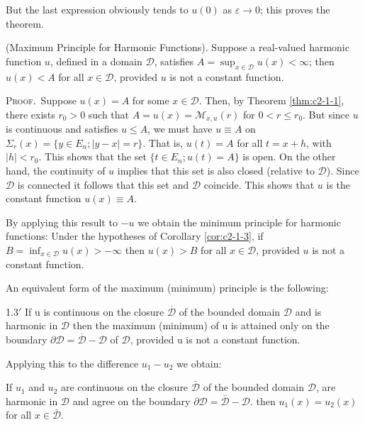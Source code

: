 But the last expression obviously tends to $u(0)$ as $\varepsilon \to 0$; this proves the theorem.

\begin{corollary}
\label{cor:c2-1-3}
(Maximum Principle for Harmonic Functions). Suppose a real-valued harmonic function $u$, defined in a domain $\mathcal{D}$, satisfies $A = \sup_{x \in \mathcal{D}} u(x) < \infty$; then $u(x) < A$ for all $x \in \mathcal{D}$, provided $u$ is not a constant function.
\end{corollary}

\textsc{Proof.}\ Suppose $u(x) = A$ for some $x \in \mathcal{D}$. Then, by Theorem \ref{thm:c2-1-1}, there exists $r_0 > 0$ such that $A = u(x) = \mathcal{M}_{x,u}(r)$ for $0 < r \leq r_0$. But since $u$ is continuous and satisfies $u \leq A$, we must have $u \equiv A$ on $\Sigma_r(x) = \{y \in E_n; |y - x| = r\}$. That is, $u(t) = A$ for all $t = x + h$, with $|h| < r_0$. This shows that the set $\{t \in E_n; u(t) = A\}$ is open. On the other hand, the continuity of $u$ implies that this set is also closed (relative to $\mathcal{D}$). Since $\mathcal{D}$ is connected it follows that this set and $\mathcal{D}$ coincide. This shows that $u$ is the constant function $u(x) \equiv A$.

By applying this result to $-u$ we obtain the minimum principle for harmonic functions: Under the hypotheses of Corollary \ref{cor:c2-1-3}, if $B = \inf_{x\in\mathcal{D}} u(x) > -\infty$ then $u(x) > B$ for all $x\in\mathcal{D}$, provided $u$ is not a constant function.

An equivalent form of the maximum (minimum) principle is the following:

\begin{customcor}{1.3$'$}
\label{cor:c2-1-3p}
If u is continuous on the closure $\overline{\mathcal{D}}$ of the bounded domain $\mathcal{D}$ and is harmonic in $\mathcal{D}$ then the maximum (minimum) of u is attained only on the boundary $\partial\mathcal{D} = \overline{\mathcal{D}} - \mathcal{D}$ of $\mathcal{D}$, provided u is not a constant function.
\end{customcor}

Applying this to the difference $u_{1}-u_{2}$ we obtain:

\begin{corollary}
\label{cor:c2-1-4}
If $u_1$ and $u_2$ are continuous on the closure $\bar{\mathcal{D}}$ of the bounded domain $\mathcal{D}$, are harmonic in $\mathcal{D}$ and agree on the boundary $\partial\mathcal{D} = \bar{\mathcal{D}} - \mathcal{D}$. then $u_1(x) = u_2(x)$ for all $x \in \bar{\mathcal{D}}$.
\end{corollary}

